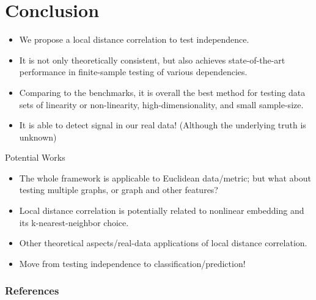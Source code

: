 \documentclass{beamer}
\begin{document}
\section{Conclusion}
\begin{frame}
\begin{itemize}[<+->]
\item We propose a local distance correlation to test independence.
\item It is not only theoretically consistent, but also achieves state-of-the-art performance in finite-sample testing of various dependencies.
\item Comparing to the benchmarks, it is overall the best method for testing data sets of linearity or non-linearity, high-dimensionality, and small sample-size.
\item It is able to detect signal in our real data! (Although the underlying truth is unknown)
\end{itemize}
\end{frame}

\begin{frame}{Potential Works}
\begin{itemize}[<+->]
\item The whole framework is applicable to Euclidean data/metric; but what about testing multiple graphs, or graph and other features?
\item Local distance correlation is potentially related to nonlinear embedding and its k-nearest-neighbor choice.
\item Other theoretical aspects/real-data applications of local distance correlation.
\item Move from testing independence to classification/prediction!
\end{itemize}
\end{frame}

%
%

\begin{frame}[allowframebreaks]

\frametitle{References}
\tiny



\end{frame}


\end{document}
